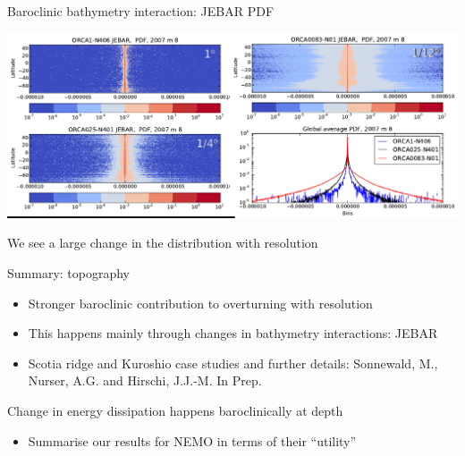 \documentclass{beamer}
\begin{document}
\begin{frame}{Baroclinic bathymetry interaction: JEBAR PDF}
\vspace{-15}
\begin{center}
\centering
\includegraphics[width=1\textwidth]{presentationJEBAR_P.png}
\end{center}
\pause
\begin{alertblock}{}
\centering We see a large change in the distribution with resolution
\end{alertblock}
\end{frame}

\begin{frame}{Summary: topography}
 \begin{itemize}
  \item Stronger baroclinic contribution to overturning with resolution
  \item This happens mainly through changes in bathymetry interactions: JEBAR
  \item Scotia ridge and Kuroshio case studies and further details: Sonnewald, M., Nurser, A.G. and Hirschi, J.J.-M. In Prep.
 \end{itemize}
 \pause
\begin{alertblock}{}
\centering
 \alert{Change in energy dissipation happens baroclinically at depth}
\end{alertblock}

\begin{itemize}
 \item Summarise our results for NEMO in terms of their ``utility''
\end{itemize}
\end{frame}
\end{document}
